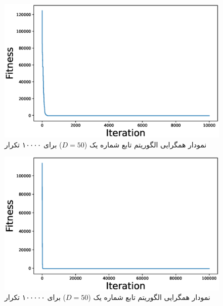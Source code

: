 \begin{figure}[H]
	\caption{نمودار همگرایی الگوریتم  تابع شماره یک ($D=50$) برای ۱۰۰۰۰ تکرار } 
	\centering 
	\includegraphics[width=16cm]{../Figure/Q1/PSO_convergence_curve_50_ite_10000} 
\end{figure}

\begin{figure}[H]
	\caption{نمودار همگرایی الگوریتم  تابع شماره یک ($D=50$) برای ۱۰۰۰۰۰ تکرار } 
	\centering 
	\includegraphics[width=16cm]{../Figure/Q1/PSO_convergence_curve_50_ite_100000} 
\end{figure}




